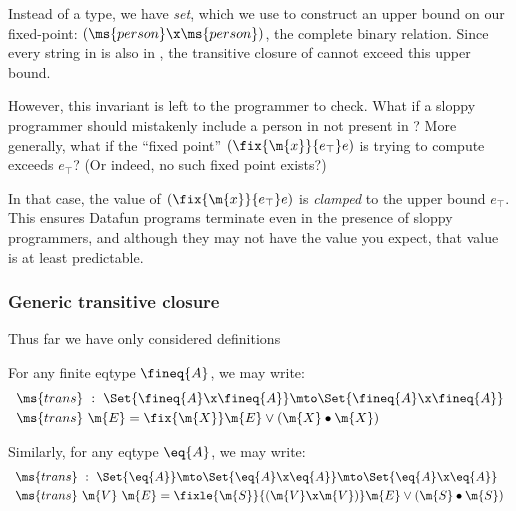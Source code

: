 Instead of a  type, we have  \emph{set}, which we use to
construct an upper bound on our fixed-point: $(\ms{person} \x \ms{person})$, the
complete binary relation. Since every string in  is also in
, the transitive closure of  cannot exceed this upper
bound.

However, this invariant is left to the programmer to check. What if a sloppy
programmer should mistakenly include a person in  not present in
? More generally, what if the ``fixed point'' $(\fix{\m{x}}{e_\top}
e)$ is trying to compute exceeds $e_\top$? (Or indeed, no such fixed point
exists?)

In that case, the value of $(\fix{\m{x}}{e_\top} e)$ is \emph{clamped} to the
upper bound $e_\top$. This ensures Datafun programs terminate even in the
presence of sloppy programmers, and although they may not have the value you
expect, that value is at least predictable.


\subsubsection{Generic transitive closure}

Thus far we have only considered definitions

For any finite eqtype $\fineq{A}$, we may write:
\[\begin{array}{l}
\ms{trans} ~:~ \Set{\fineq{A} \x \fineq{A}} \mto \Set{\fineq{A} \x \fineq{A}}
\vspace{0.3em}\\
\ms{trans}\ \m{E} = \fix{\m{X}} \m{E} \vee (\m{X} \bullet \m{X})
\end{array}\]

\noindent Similarly, for any eqtype $\eq{A}$, we may write:
\[\begin{array}{l}
\ms{trans} ~:~
\Set{\eq{A}} \mto \Set{\eq{A} \x \eq{A}} \mto \Set{\eq{A} \x \eq{A}}
\vspace{0.3em}\\
\ms{trans}\ \m{V}\ \m{E} = %
\fixle{\m{S}}{(\m{V} \x \m{V})} \m{E} \vee (\m{S} \bullet \m{S})
\end{array}\]

